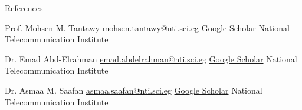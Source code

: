 \documentclass[]{mcdowellcv}
\begin{document}
	
	\begin{cvsection}{References}
		\begin{cvsubsection}{Prof. Mohsen M. Tantawy}
			{\href{mailto:mohsen.tantawy@nti.sci.eg}{mohsen.tantawy@nti.sci.eg}}
			{\href{https://scholar.google.com.eg/citations?user=gT9R42IAAAAJ\&hl=en}{Google Scholar}}
			National Telecommunication Institute
		\end{cvsubsection}
		
		\begin{cvsubsection}{Dr. Emad Abd-Elrahman}
			{\href{mailto:emad.abdelrahman@nti.sci.eg}{emad.abdelrahman@nti.sci.eg}}
			{\href{https://scholar.google.com.eg/citations?hl=en\&user=b7V0T3sAAAAJ}{Google Scholar}}
			National Telecommunication Institute
		\end{cvsubsection}
		
		\begin{cvsubsection}{Dr. Asmaa M. Saafan}
			{\href{mailto:asmaa.saafan@nti.sci.eg}{asmaa.saafan@nti.sci.eg}}
			{\href{https://scholar.google.com.eg/citations?hl=en\&user=Zl-Caz0AAAAJ}{Google Scholar}}
			National Telecommunication Institute
		\end{cvsubsection}
	\end{cvsection}
	
	
	
	
	
	
	
	
	
\end{document}
